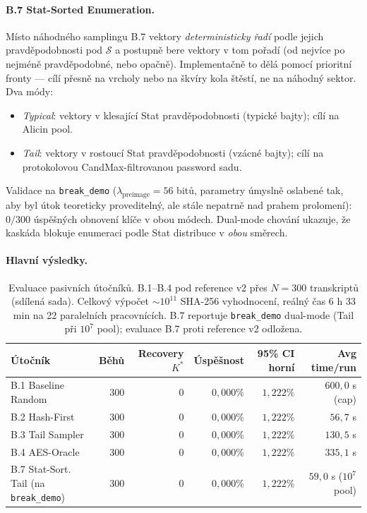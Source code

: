\documentclass[11pt,a4paper]{article}
\begin{document}
\paragraph{B.7 Stat-Sorted Enumeration.} Místo náhodného samplingu B.7 vektory \emph{deterministicky řadí} podle jejich pravděpodobnosti pod $\mathcal{S}$ a postupně bere vektory v tom pořadí (od nejvíce po nejméně pravděpodobné, nebo opačně). Implementačně to dělá pomocí prioritní fronty --- cílí přesně na vrcholy nebo na škvíry kola štěstí, ne na náhodný sektor. Dva módy:
\begin{itemize}[leftmargin=*]
\item \emph{Typical}: vektory v klesající Stat pravděpodobnosti (typické bajty); cílí na Alicin pool.
\item \emph{Tail}: vektory v rostoucí Stat pravděpodobnosti (vzácné bajty); cílí na protokolovou CandMax-filtrovanou password sadu.
\end{itemize}
Validace na \texttt{break\_demo} ($\lambda_\text{preimage}=56$ bitů, parametry úmyslně oslabené tak, aby byl útok teoreticky proveditelný, ale stále nepatrně nad prahem prolomení): $0/300$ úspěšných obnovení klíče v obou módech. Dual-mode chování ukazuje, že kaskáda blokuje enumeraci podle Stat distribuce v \emph{obou} směrech.

\paragraph{Hlavní výsledky.}

\begin{table}[ht]
\centering
\small
\begin{tabular}{lrrrrr}
\toprule
Útočník & Běhů & Recovery $K^*$ & Úspěšnost & 95\% CI horní & Avg time/run \\
\midrule
B.1 Baseline Random & 300 & 0 & $0{,}000\%$ & $1{,}222\%$ & $600{,}0$ s (cap) \\
B.2 Hash-First & 300 & 0 & $0{,}000\%$ & $1{,}222\%$ & $56{,}7$ s \\
B.3 Tail Sampler & 300 & 0 & $0{,}000\%$ & $1{,}222\%$ & $130{,}5$ s \\
B.4 AES-Oracle & 300 & 0 & $0{,}000\%$ & $1{,}222\%$ & $335{,}1$ s \\
B.7 Stat-Sort. Tail (na \texttt{break\_demo}) & 300 & 0 & $0{,}000\%$ & $1{,}222\%$ & $59{,}0$ s ($10^7$ pool) \\
\bottomrule
\end{tabular}
\caption{Evaluace pasivních útočníků. B.1--B.4 pod reference v2 přes $N=300$ transkriptů (sdílená sada). Celkový výpočet $\sim 10^{11}$ SHA-256 vyhodnocení, reálný čas 6 h 33 min na 22 paralelních pracovnících. B.7 reportuje \texttt{break\_demo} dual-mode (Tail při $10^7$ pool); evaluace B.7 proti reference v2 odložena.}
\label{tab:pop-attackers}
\end{table}
\end{document}
